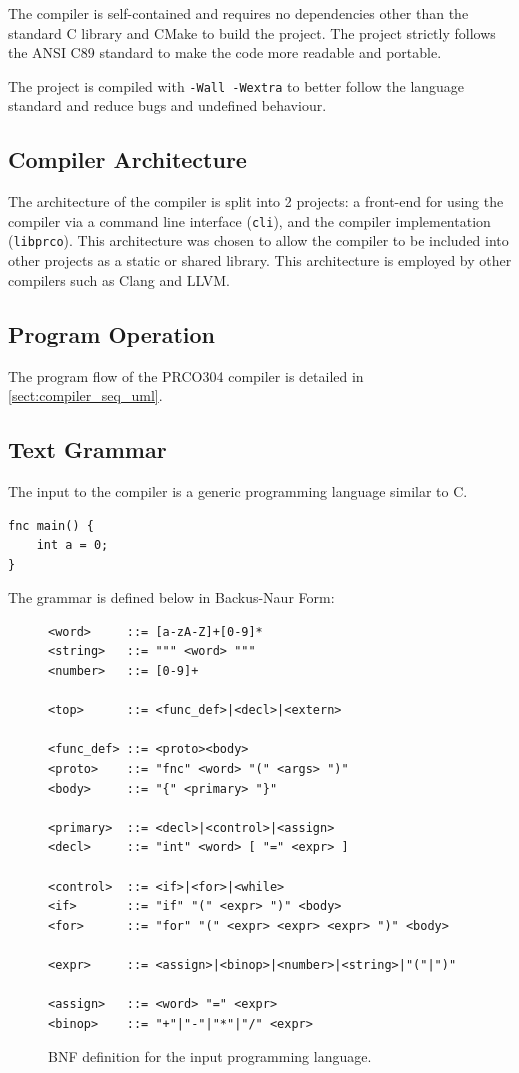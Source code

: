\documentclass[11pt,a4paper]{report}
\newcommand{\scname}{PRCO304}
\begin{document}
The compiler is self-contained and requires no dependencies other than the standard C library and CMake to build the project. The project strictly follows the ANSI C89 standard to make the code more readable and portable. 

The project is compiled with \verb|-Wall -Wextra| to better follow the language standard and reduce bugs and undefined behaviour.

\subsection{Compiler Architecture}
The architecture of the compiler is split into 2 projects: a front-end for using the compiler via a command line interface (\verb|cli|), and the compiler implementation (\verb|libprco|). This architecture was chosen to allow the compiler to be included into other projects as a static or shared library. This architecture is employed by other compilers such as Clang and LLVM. 


\subsection{Program Operation}
The program flow of the \scname{} compiler is detailed in {} \ref{sect:compiler_seq_uml}. 



\subsection{Text Grammar}
\label{sect:compiler_grammar}
The input to the compiler is a generic programming language similar to C.

\begin{verbatim}
fnc main() {
    int a = 0;
}
\end{verbatim}

The grammar is defined below in Backus-Naur Form:
\begin{figure}[H]
\begin{verbatim}
<word>     ::= [a-zA-Z]+[0-9]*
<string>   ::= """ <word> """
<number>   ::= [0-9]+

<top>      ::= <func_def>|<decl>|<extern>

<func_def> ::= <proto><body>
<proto>    ::= "fnc" <word> "(" <args> ")" 
<body>     ::= "{" <primary> "}"

<primary>  ::= <decl>|<control>|<assign>
<decl>     ::= "int" <word> [ "=" <expr> ]

<control>  ::= <if>|<for>|<while>
<if>       ::= "if" "(" <expr> ")" <body>
<for>      ::= "for" "(" <expr> <expr> <expr> ")" <body>

<expr>     ::= <assign>|<binop>|<number>|<string>|"("|")"

<assign>   ::= <word> "=" <expr>
<binop>    ::= "+"|"-"|"*"|"/" <expr>
\end{verbatim}
\label{fig:compiler_grammar_bnf}
\caption{BNF definition for the input programming language.}
\end{figure}
\end{document}
